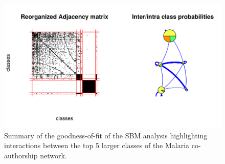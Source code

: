 \begin{figure}[!ht]
\centering
\includegraphics[scale=0.75]{Chapters/malaria/statMod/unnamed-chunk-3-1}
\caption{Summary of the goodness-of-fit of the SBM analysis highlighting interactions between the top 5 larger classes of the Malaria co-authorship network.}
\label{fig:malaria_sbmgof2}
\end{figure}
%
%
%
